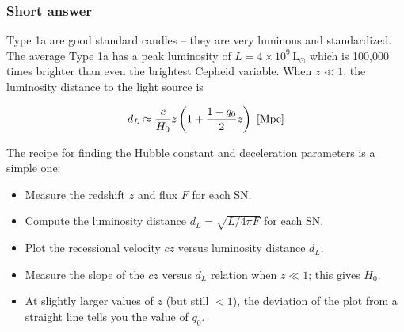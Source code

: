 \documentclass[a4paper,11pt]{article}
\begin{document}
\subsubsection{Short answer}

Type 1a are good standard candles -- they are very luminous and standardized. The average Type 1a has a peak luminosity of $L=4\times10^9\,\mathrm{L}_\odot$ which is 100,000 times brighter than even the brightest Cepheid variable. When $z\ll1$, the luminosity distance to the light source is

\begin{align*}
    d_L \approx \frac{c}{H_0}z \left(1+\frac{1-q_0}{2}z\right) ~ [{\rm Mpc}]
\end{align*}

{\noindent}The recipe for finding the Hubble constant and deceleration parameters is a simple one:

\begin{itemize}
    \item Measure the redshift $z$ and flux $F$ for each SN.
    \item Compute the luminosity distance $d_L=\sqrt{L/4\pi F}$ for each SN.
    \item Plot the recessional velocity $cz$ versus luminosity distance $d_L$.
    \item Measure the slope of the $cz$ versus $d_L$ relation when $z\ll1$; this gives $H_0$.
    \item At slightly larger values of $z$ (but still $<1$), the deviation of the plot from a straight line tells you the value of $q_0$.
\end{itemize}
\end{document}
